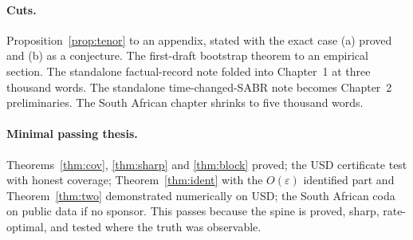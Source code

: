 \documentclass[11pt,a4paper]{article}
\theoremstyle{plain}
\theoremstyle{definition}
\theoremstyle{remark}
\begin{document}
\paragraph{Cuts.} Proposition~\ref{prop:tenor} to an appendix, stated with the exact case (a) proved and (b) as a conjecture. The first-draft bootstrap theorem to an empirical section. The standalone factual-record note folded into Chapter~1 at three thousand words. The standalone time-changed-SABR note becomes Chapter~2 preliminaries. The South African chapter shrinks to five thousand words.

\paragraph{Minimal passing thesis.} Theorems~\ref{thm:cov}, \ref{thm:sharp} and \ref{thm:block} proved; the USD certificate test with honest coverage; Theorem~\ref{thm:ident} with the $O(\varepsilon)$ identified part and Theorem~\ref{thm:two} demonstrated numerically on USD; the South African coda on public data if no sponsor. This passes because the spine is proved, sharp, rate-optimal, and tested where the truth was observable.
\end{document}

